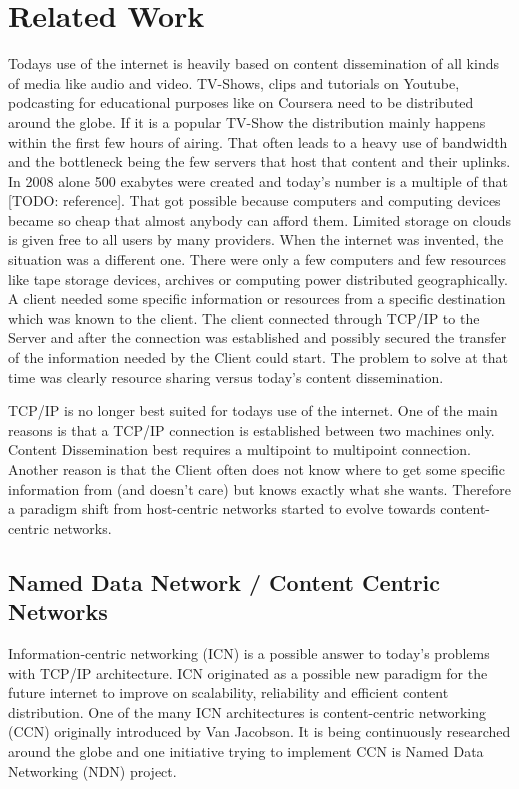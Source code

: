 \chapter{Related Work}

Todays use of the internet is heavily based on content dissemination of all kinds of media like audio and video. TV-Shows, clips and tutorials on Youtube, podcasting for educational purposes like on Coursera need to be distributed around the globe. If it is a popular TV-Show the distribution mainly happens within the first few hours of airing. That often leads to a heavy use of bandwidth and the bottleneck being the few servers that host that content and their uplinks. In 2008 alone 500 exabytes were created and today's number is a multiple of that [TODO: reference]. That got possible because computers and computing devices became so cheap that almost anybody can afford them. Limited storage on clouds is given free to all users by many providers. When the internet was invented, the situation was a different one. There were only a few computers and few resources like tape storage devices, archives or computing power distributed geographically. A client needed some specific information or resources from a specific destination which was known to the client. The client connected through TCP/IP to the Server and after the connection was established and possibly secured the transfer of the information needed by the Client could start. The problem to solve at that time was clearly resource sharing versus today's content dissemination.

\vspace{5mm} %

TCP/IP is no longer best suited for todays use of the internet. One of the main reasons is that a TCP/IP connection is established between two machines only. Content Dissemination best requires a multipoint to multipoint connection. Another reason is that the Client often does not know where to get some specific information from (and doesn't care) but knows exactly what she wants. Therefore a paradigm shift from host-centric networks started to evolve towards content-centric networks.

\newpage
\section{Named Data Network / Content Centric Networks}

Information-centric networking (ICN) is a possible answer to today's problems with TCP/IP architecture. ICN originated as a possible new paradigm for the future internet to improve on scalability, reliability and efficient content distribution. One of the many ICN architectures is content-centric networking (CCN) originally introduced by Van Jacobson. It is being continuously researched around the globe and one initiative trying to implement CCN is Named Data Networking (NDN) project.

